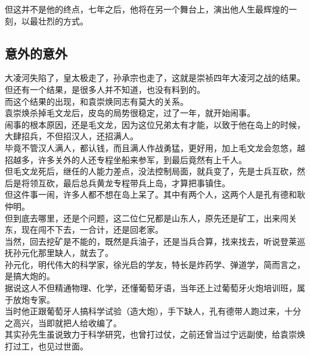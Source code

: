 \begin{multicols}{\theparacolNo}
但这并不是他的终点，七年之后，他将在另一个舞台上，演出他人生最辉煌的一刻，以最壮烈的方式。\\

\subsection{意外的意外}
大凌河失陷了，皇太极走了，孙承宗也走了，这就是崇祯四年大凌河之战的结果。\\

但还有一个结果，是很多人并不知道，也没有料到的。\\

而这个结果的出现，和袁崇焕同志有莫大的关系。\\

袁崇焕杀掉毛文龙后，皮岛的局势很稳定，过了一年，就开始闹事。\\

闹事的根本原因，还是毛文龙，因为这位兄弟太有才能，以致于他在岛上的时候，大肆招兵，不但招汉人，还招满人。\\

毕竟不管汉人满人，都认钱，而且满人作战勇猛，更好用，加上毛文龙会忽悠，越招越多，许多关外的人还专程坐船来参军，到最后竟然有上千人。\\

但毛文龙死后，继任的人能力差点，没法控制局面，就兵变了，先是士兵互砍，然后是将领互砍，最后总兵黄龙专程带兵上岛，才算把事镇住。\\

但这件事一闹，许多人都不想在岛上呆了。其中有两个人，这两个人是孔有德和耿仲明。\\

但到底去哪里，还是个问题，这二位仁兄都是山东人，原先还是矿工，出来闯关东，现在闯不下去，一合计，还是回老家。\\

当然，回去挖矿是不能的，既然是兵油子，还是当兵合算，找来找去，听说登莱巡抚孙元化那里缺人，就去了。\\

孙元化，明代伟大的科学家，徐光启的学友，特长是炸药学、弹道学，简而言之，是搞大炮的。\\

据说这人不但精通物理、化学，还懂葡萄牙语，当年还上过葡萄牙火炮培训班，属于放炮专家。\\

当时他正跟葡萄牙人搞科学试验（造大炮），手下缺人，孔有德带人跑过来，十分之高兴，当即就把人给收编了。\\

其实孙先生虽说致力于科学研究，也曾打过仗，之前还曾当过宁远副使，给袁崇焕打过工，也见过世面。\\


\end{multicols}

